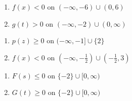 \begin{multicols}{2}
\begin{enumerate}
\setcounter{enumi}{\value{HW}}

\item $f(x) < 0$ on $(-\infty, -6) \cup (0, 6)$

\item $g(t) > 0$ on $(-\infty, -2) \cup (0, \infty)$

\setcounter{HW}{\value{enumi}}
\end{enumerate}
\end{multicols}

\begin{multicols}{2}
\begin{enumerate}
\setcounter{enumi}{\value{HW}}

\item $p(z) \geq 0$ on $(-\infty, -1] \cup \{ 2\}$

\item $f(x) < 0$ on $\left( -\infty, -\frac{1}{2} \right) \cup \left(-\frac{1}{2}, 3 \right)$

\setcounter{HW}{\value{enumi}}
\end{enumerate}
\end{multicols}

\begin{multicols}{2}
\begin{enumerate}
\setcounter{enumi}{\value{HW}}

\item $F(s) \leq 0$ on $\{-2\} \cup [0, \infty)$

\item $G(t) \geq 0$ on $\{-2\} \cup [0, \infty)$

\setcounter{HW}{\value{enumi}}
\end{enumerate}
\end{multicols}


